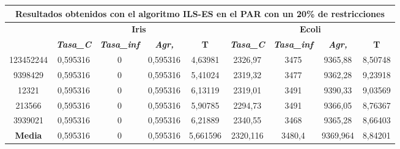 \documentclass[12pt, spanish]{article}
\begin{document}
\begin{table}[H]
\begin{tabular}{|c|c|c|c|c|c|c|c|c|}
\hline
\multicolumn{9}{|c|}{\textbf{Resultados obtenidos con el algoritmo ILS-ES en el PAR con un 20\% de restricciones}}                                                                                                \\ \hline
\multirow{2}{*}{} & \multicolumn{4}{c|}{\textbf{Iris}}                                                            & \multicolumn{4}{c|}{\textbf{Ecoli}}                                                           \\ \cline{2-9} 
                  & \textit{\textbf{Tasa\_C}} & \textit{\textbf{Tasa\_inf}} & \textit{\textbf{Agr,}} & \textbf{T} & \textit{\textbf{Tasa\_C}} & \textit{\textbf{Tasa\_inf}} & \textit{\textbf{Agr,}} & \textbf{T} \\ \hline
123452244         & 0,595316                  & 0                           & 0,595316               & 4,63981    & 2326,97                   & 3475                        & 9365,88                & 8,50748    \\ \hline
9398429           & 0,595316                  & 0                           & 0,595316               & 5,41024    & 2319,32                   & 3477                        & 9362,28                & 9,23918    \\ \hline
12321             & 0,595316                  & 0                           & 0,595316               & 6,13119    & 2319,01                   & 3491                        & 9390,33                & 9,03569    \\ \hline
213566            & 0,595316                  & 0                           & 0,595316               & 5,90785    & 2294,73                   & 3491                        & 9366,05                & 8,76367    \\ \hline
3939021           & 0,595316                  & 0                           & 0,595316               & 6,21889    & 2340,55                   & 3468                        & 9365,28                & 8,66403    \\ \hline
\textbf{Media}    & 0,595316                  & 0                           & 0,595316               & 5,661596   & 2320,116                  & 3480,4                      & 9369,964               & 8,84201    \\ \hline
\end{tabular}
\end{table}
\end{document}
